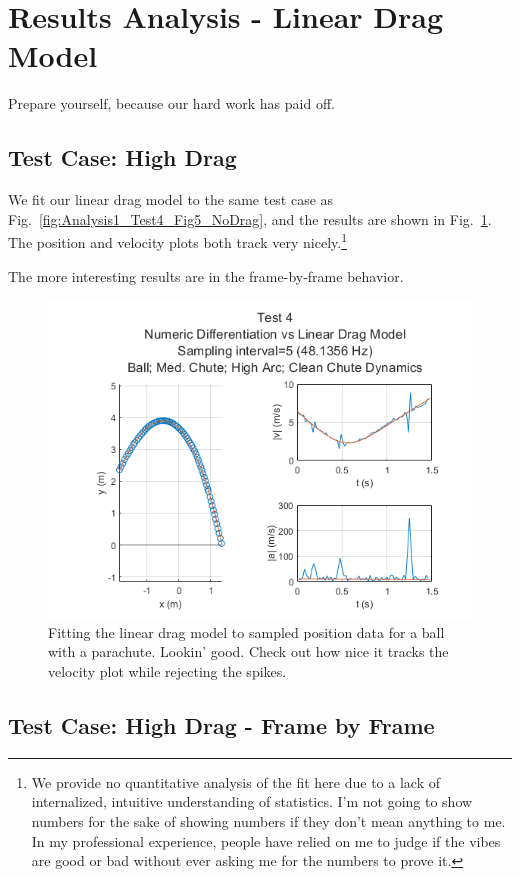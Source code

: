 \section{Results Analysis - Linear Drag Model}
Prepare yourself, because our hard work has paid off.

\subsection{Test Case: High Drag}
We fit our linear drag model to the same test case as Fig.~\ref{fig:Analysis1_Test4_Fig5_NoDrag}, and the results are shown in Fig.~\ref{fig:Analysis2_Test4_Fig5_LinearDrag}. The position and velocity plots both track very nicely.\footnote{We provide no quantitative analysis of the fit here due to a lack of internalized, intuitive understanding of statistics. I'm not going to show numbers for the sake of showing numbers if they don't mean anything to me. In my professional experience, people have relied on me to judge if the vibes are good or bad without ever asking me for the numbers to prove it.}

The more interesting results are in the frame-by-frame behavior.

\begin{figure}[t]
\centering
\includegraphics[width=0.9\linewidth]{images/Analysis2_Test4_Fig5_LinearDrag.png}
\caption{\label{fig:Analysis2_Test4_Fig5_LinearDrag} Fitting the linear drag model to sampled position data for a ball with a parachute. Lookin' good. Check out how nice it tracks the velocity plot while rejecting the spikes.}
\end{figure}

\subsection{Test Case: High Drag - Frame by Frame}

